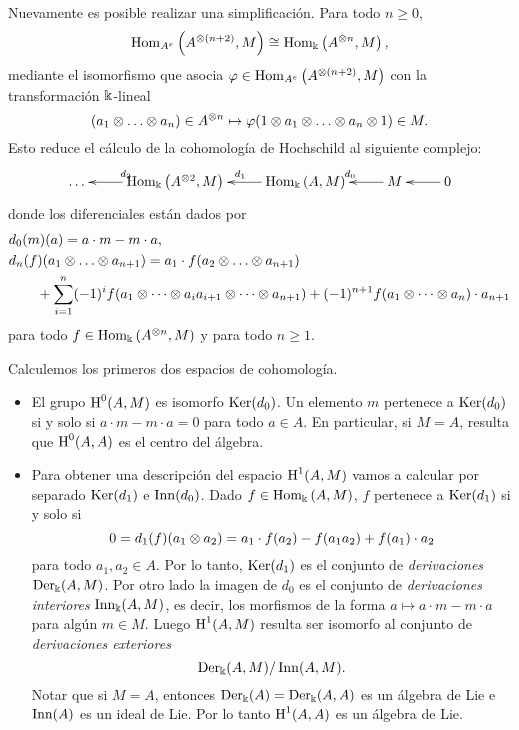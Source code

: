 \documentclass[a4paper,oneside,fleqn,11pt,../tesis.tex]{subfiles}
\begin{document}
Nuevamente es posible realizar una simplificación. Para todo
$n \geq 0$,
\[
	\operatorname{Hom}_{A^e}\left(A^{\otimes (n + 2)}, M\right) \cong \operatorname{Hom}_{\Bbbk}\left(A^{\otimes n}, M\right),
\]
mediante el isomorfismo que asocia $\varphi \in \operatorname{Hom}_{A^e}\left(A^{\otimes (n + 2)}, M \right)$ con la transformación $\Bbbk$-lineal
\[
	(a_1 \otimes \ldots \otimes a_n) \in A^{\otimes n} \mapsto \varphi(1 \otimes a_1 \otimes \ldots \otimes a_n \otimes 1) \in M.
\]
Esto reduce el cálculo de la cohomología de Hochschild al siguiente complejo:
\begin{align*}
	\xymatrix{
		\ldots & \Hom_{\field}\left(A^{\ox 2}, M\right) \ar[l]_{d_2} & \Hom_{\field}\left(A, M\right) \ar[l]_{d_1}
			& M \ar[l]_{d_0} & 0 \ar[l],
	}
\end{align*}
donde los diferenciales están dados por
\begin{align*}
	&d_0(m)(a) = a\cdot m - m\cdot a,\\
	&d_n(f)(a_1 \otimes \ldots \otimes a_{n +1}) = a_1 \cdot f(a_2 \otimes \ldots \otimes a_{n + 1})\\
	&\qquad + \sum_{i = 1}^{n}(-1)^{i} f(a_1 \otimes \cdots \otimes a_i a_{i + 1} \otimes \cdots \otimes a_{n+1})
		 	+ (-1)^{n + 1} f(a_1 \otimes \cdots \otimes a_{n}) \cdot a_{n + 1}
\end{align*}
para todo $f \in \operatorname{Hom}_{\Bbbk}\left(A^{\otimes n}, M\right)$ y para todo $n \geq 1$.

Calculemos los primeros dos espacios de cohomología.
\begin{itemize}
	\item El grupo $\operatorname{H}^{0}(A, M)$ es isomorfo $\operatorname{Ker}(d_0)$.
	Un elemento $m$ pertenece a $\operatorname{Ker}(d_0)$ si y solo si $a\cdot m - m \cdot a = 0$ para todo $a \in A$. En particular,
	si $M = A$, resulta que $\operatorname{H}^{0}(A, A)$ es el centro del álgebra.
	
	\item Para obtener una descripción del espacio $\operatorname{H}^{1}(A, M)$ vamos a calcular por separado $\operatorname{Ker}(d_1)$
	e $\operatorname{Inn}(d_0)$. Dado $f \in \operatorname{Hom}_{\Bbbk}\left(A, M\right)$, $f$ pertenece a $\operatorname{Ker}(d_1)$ si y solo si
	\[
		0 = d_1(f)(a_1\otimes a_2) = a_1\cdot f(a_2) - f(a_1 a_2) + f(a_1)\cdot a_2
	\]
	para todo $a_1, a_2 \in A$. Por lo tanto, $\operatorname{Ker}(d_1)$ es el conjunto de \emph{derivaciones} $\operatorname{Der}_{\Bbbk}(A, M)$. Por otro lado
	la imagen de $d_0$ es el conjunto de \emph{derivaciones interiores} $\operatorname{Inn}_{\Bbbk}(A, M)$, es decir, los morfismos de la forma
	$a \mapsto a\cdot m - m\cdot a$ para algún $m \in M$. Luego $\operatorname{H}^{1}(A, M)$ resulta ser isomorfo al conjunto de \emph{derivaciones exteriores}
	\[
		\operatorname{Der}_{\Bbbk}(A, M) / \operatorname{Inn}(A, M).
	\]
	Notar que si $M = A$, entonces $\operatorname{Der}_{\Bbbk}(A) = \operatorname{Der}_{\Bbbk}(A,A)$ es un álgebra de Lie e $\operatorname{Inn}(A)$ es un ideal de Lie.
	Por lo tanto $\operatorname{H}^{1}(A, A)$ es un álgebra de Lie.
	
\end{itemize}
\end{document}

